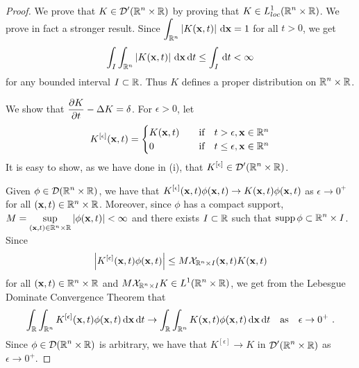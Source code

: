 \begin{proof}
 We prove that $\displaystyle K\in \mathcal{D}'(\mathbb{R}^n\times \mathbb{R})$ by
proving that $\displaystyle K \in L^1_{loc}(\mathbb{R}^n \times \mathbb{R})$.  We
prove in fact a stronger result.  Since
$\displaystyle \int_{\mathbb{R}^n} \left| K(\mathbf{x},t) \right| \,\mathrm{d}{\mathbf{x}} = 1$
for all $t>0$, we get
\[
\int_I \int_{\mathbb{R}^n} \left| K(\mathbf{x},t) \right| \,\mathrm{d}{\mathbf{x}} \,\mathrm{d}{t}
\leq \int_I \,\mathrm{d}{t} < \infty
\]
for any bounded interval $I \subset \mathbb{R}$.  Thus $K$ defines a proper
distribution on $\displaystyle \mathbb{R}^n \times \mathbb{R}$.

 We show that
$\displaystyle \frac{\partial{K}}{\partial t} - \Delta K = \delta$.  For $\epsilon>0$,
let
\[
K^{[\epsilon]}(\mathbf{x},t) =
\begin{cases}
K(\mathbf{x}, t) & \quad \text{if} \quad t > \epsilon, \mathbf{x} \in \mathbb{R}^n \\
0 & \quad \text{if} \quad t \leq \epsilon, \mathbf{x} \in \mathbb{R}^n \\
\end{cases}
\]
It is easy to show, as we have done in (i), that
$\displaystyle K^{[\epsilon]}\in \mathcal{D}'(\mathbb{R}^n\times \mathbb{R})$.

Given $\displaystyle \phi \in \mathcal{D}(\mathbb{R}^n \times \mathbb{R})$,
we have that $\displaystyle K^{[\epsilon]}(\mathbf{x},t) \phi(\mathbf{x},t)
\rightarrow K(\mathbf{x},t) \phi(\mathbf{x},t)$ as
$\epsilon \rightarrow 0^+$ for all $(\mathbf{x},t) \in \mathbb{R}^n\times \mathbb{R}$.
Moreover, since $\phi$ has a compact support,
$\displaystyle M = \sup_{(\mathbf{x},t) \in \mathbb{R}^n \times \mathbb{R}} |\phi(\mathbf{x},t)|
< \infty$ and there exists $I \subset \mathbb{R}$ such that
$\displaystyle \operatorname{supp} \phi \subset \mathbb{R}^n \times I$. 
Since
\[
\left| K^{[\epsilon]}(\mathbf{x},t) \phi(\mathbf{x},t) \right|
\leq M {\cal X}_{\mathbb{R}^n \times I}(\mathbf{x},t) K(\mathbf{x},t)
\]
for all $(\mathbf{x},t) \in \mathbb{R}^n\times \mathbb{R}$ and
$\displaystyle M {\cal X}_{\mathbb{R}^n \times I} K \in L^1(\mathbb{R}^n \times \mathbb{R})$,
we get from the Lebesgue Dominate Convergence Theorem that
\[
\int_{\mathbb{R}} \int_{\mathbb{R}^n} K^{[\epsilon]}(\mathbf{x},t) \phi(\mathbf{x},t)
\,\mathrm{d}{\mathbf{x}}\,\mathrm{d}{t} \to
\int_{\mathbb{R}} \int_{\mathbb{R}^n} K(\mathbf{x},t) \phi(\mathbf{x},t)
\,\mathrm{d}{\mathbf{x}}\,\mathrm{d}{t} \quad \text{as} \quad \epsilon \to 0^+ \ .
\]
Since $\displaystyle \phi \in \mathcal{D}(\mathbb{R}^n \times \mathbb{R})$ is arbitrary,
we have that $\displaystyle K^{[\epsilon]} \rightarrow K$ in
$\displaystyle \mathcal{D}'(\mathbb{R}^n\times \mathbb{R})$ as $\epsilon \rightarrow 0^+$.


\end{proof}
